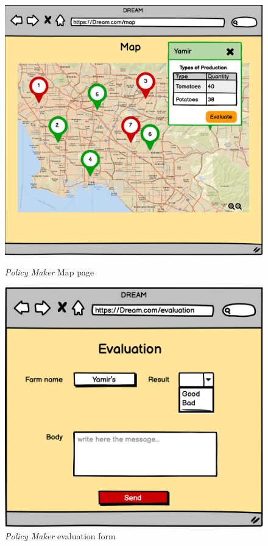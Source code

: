\begin{figure}[ht!]
    \begin{minipage}{0.48\textwidth}
        \centering
        \includegraphics[width=1\textwidth]{mockups/PMMap.png}
        \caption{\emph{Policy Maker} Map page}
        \label{fig:PMmap}
    \end{minipage}\hfill
    \begin{minipage}{0.5\textwidth}
        \centering
        \includegraphics[width=1\textwidth]{mockups/Evaluation.png}
        \caption{\emph{Policy Maker} evaluation form}
        \label{fig:PMevaluation}
    \end{minipage}
\end{figure}


